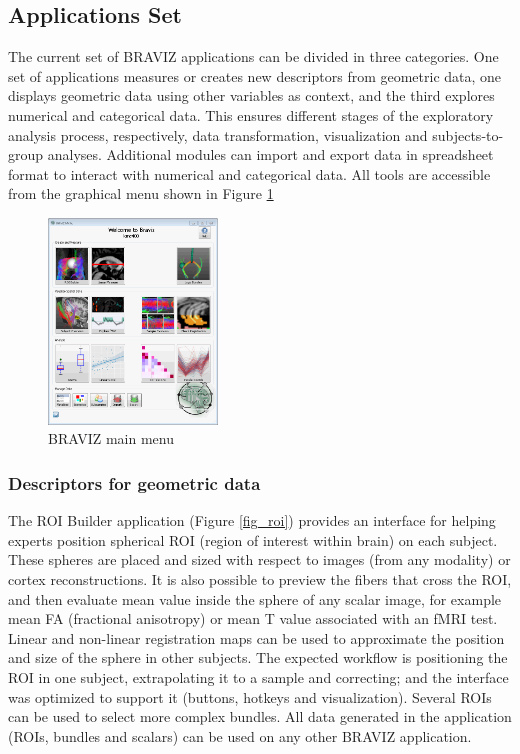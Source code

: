 \documentclass[twocolumn]{svjour3}
\begin{document}
\subsection{Applications Set}


The current set of BRAVIZ applications can be divided in three categories. One set of applications measures or creates new descriptors from geometric data, one displays geometric data using other variables as context, and the third explores numerical and categorical data. This ensures different stages of the exploratory analysis process, respectively, data transformation, visualization and subjects-to-group analyses. Additional modules can import and export data in spreadsheet format to interact with numerical and categorical data. All tools  are accessible from the graphical menu shown in Figure \ref{fig_menu}

\begin{figure}
\begin{center}
\includegraphics[width=0.4\textwidth]{figures/braviz_menu.PNG}
\end{center}
 \caption{\label{fig_menu} BRAVIZ main menu }
\end{figure}


\subsubsection{Descriptors for geometric data}

The ROI Builder application (Figure \ref{fig_roi}) provides an interface for helping experts position spherical ROI  (region of interest within brain) on each subject. These spheres are placed and sized with respect to images (from any modality) or cortex reconstructions. It is also possible to preview the fibers that cross the ROI, and then evaluate mean value inside the sphere of any scalar image, for example mean FA (fractional anisotropy) or mean T value associated with an fMRI test. 
Linear and non-linear registration maps can be used to approximate the position and size of the sphere in other subjects. The expected workflow is positioning the ROI in one subject, extrapolating it to a sample and correcting; and the interface was optimized to support it (buttons, hotkeys and visualization). Several ROIs can be used to select more complex bundles. All data generated in the application (ROIs, bundles and scalars) can be used on any other BRAVIZ application. 
\end{document}
